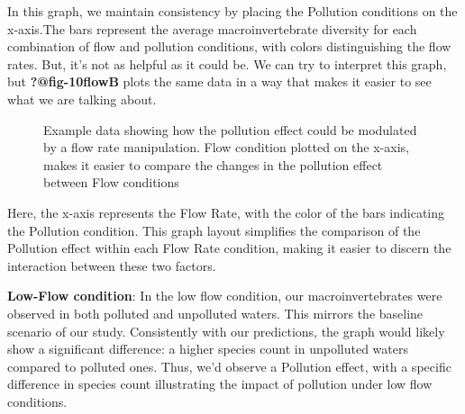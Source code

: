 \documentclass[
  letterpaper,
  DIV=11,
  numbers=noendperiod]{scrreprt}
\begin{document}
In this graph, we maintain consistency by placing the Pollution
conditions on the x-axis.The bars represent the average
macroinvertebrate diversity for each combination of flow and pollution
conditions, with colors distinguishing the flow rates. But, it's not as
helpful as it could be. We can try to interpret this graph, but
\textbf{?@fig-10flowB} plots the same data in a way that makes it easier
to see what we are talking about.

\begin{figure}


\caption{\label{fig-10FlowB}Example data showing how the pollution
effect could be modulated by a flow rate manipulation. Flow condition
plotted on the x-axis, makes it easier to compare the changes in the
pollution effect between Flow conditions}

\end{figure}%

Here, the x-axis represents the Flow Rate, with the color of the bars
indicating the Pollution condition. This graph layout simplifies the
comparison of the Pollution effect within each Flow Rate condition,
making it easier to discern the interaction between these two factors.

\textbf{Low-Flow condition}: In the low flow condition, our
macroinvertebrates were observed in both polluted and unpolluted waters.
This mirrors the baseline scenario of our study. Consistently with our
predictions, the graph would likely show a significant difference: a
higher species count in unpolluted waters compared to polluted ones.
Thus, we'd observe a Pollution effect, with a specific difference in
species count illustrating the impact of pollution under low flow
conditions.
\end{document}
